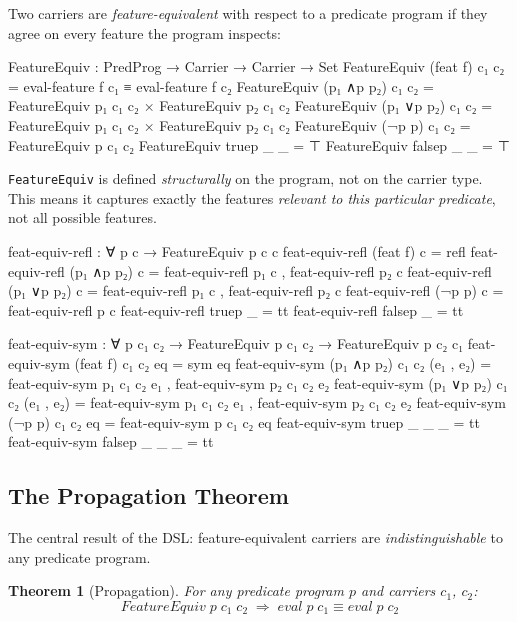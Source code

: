 \documentclass[9pt,a4paper]{article}
\theoremstyle{plain}
\newtheorem{theorem}{Theorem}
\theoremstyle{definition}
\theoremstyle{remark}
\begin{document}
Two carriers are \emph{feature-equivalent} with respect to a predicate program if they agree on every feature the program inspects:

\begin{code}
  FeatureEquiv : PredProg → Carrier → Carrier → Set
  FeatureEquiv (feat f)    c₁ c₂ = eval-feature f c₁ ≡ eval-feature f c₂
  FeatureEquiv (p₁ ∧p p₂) c₁ c₂ = FeatureEquiv p₁ c₁ c₂ × FeatureEquiv p₂ c₁ c₂
  FeatureEquiv (p₁ ∨p p₂) c₁ c₂ = FeatureEquiv p₁ c₁ c₂ × FeatureEquiv p₂ c₁ c₂
  FeatureEquiv (¬p p)      c₁ c₂ = FeatureEquiv p c₁ c₂
  FeatureEquiv truep       _  _  = ⊤
  FeatureEquiv falsep      _  _  = ⊤
\end{code}

\noindent \texttt{FeatureEquiv} is defined \emph{structurally} on the program, not on the carrier type.  This means it captures exactly the features \emph{relevant to this particular predicate}, not all possible features.

\begin{code}
  feat-equiv-refl : ∀ p c → FeatureEquiv p c c
  feat-equiv-refl (feat f)    c = refl
  feat-equiv-refl (p₁ ∧p p₂) c = feat-equiv-refl p₁ c , feat-equiv-refl p₂ c
  feat-equiv-refl (p₁ ∨p p₂) c = feat-equiv-refl p₁ c , feat-equiv-refl p₂ c
  feat-equiv-refl (¬p p)      c = feat-equiv-refl p c
  feat-equiv-refl truep       _ = tt
  feat-equiv-refl falsep      _ = tt

  feat-equiv-sym : ∀ p c₁ c₂ → FeatureEquiv p c₁ c₂ → FeatureEquiv p c₂ c₁
  feat-equiv-sym (feat f)    c₁ c₂ eq         = sym eq
  feat-equiv-sym (p₁ ∧p p₂) c₁ c₂ (e₁ , e₂) =
    feat-equiv-sym p₁ c₁ c₂ e₁ , feat-equiv-sym p₂ c₁ c₂ e₂
  feat-equiv-sym (p₁ ∨p p₂) c₁ c₂ (e₁ , e₂) =
    feat-equiv-sym p₁ c₁ c₂ e₁ , feat-equiv-sym p₂ c₁ c₂ e₂
  feat-equiv-sym (¬p p)      c₁ c₂ eq         = feat-equiv-sym p c₁ c₂ eq
  feat-equiv-sym truep       _  _  _           = tt
  feat-equiv-sym falsep      _  _  _           = tt
\end{code}

\subsection{The Propagation Theorem}

The central result of the DSL: feature-equivalent carriers are \emph{indistinguishable} to any predicate program.

\begin{theorem}[Propagation]
\label{thm:propagation}
For any predicate program $p$ and carriers $c_1$, $c_2$:
\[
\mathit{FeatureEquiv}\;p\;c_1\;c_2 \;\Longrightarrow\; \mathit{eval}\;p\;c_1 \equiv \mathit{eval}\;p\;c_2
\]
\end{theorem}
\end{document}
